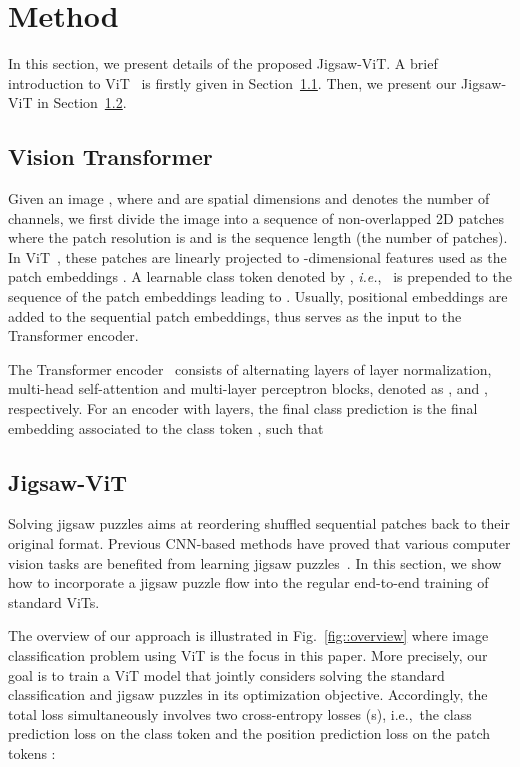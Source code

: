 \documentclass{article}
\begin{document}
\section{Method}
\label{sec:method}
In this section, we present details of the proposed Jigsaw-ViT. 
A brief introduction to ViT~\cite{dosovitskiy2021an} is firstly given in Section~\ref{subsec::ViT}. 
Then, we present our Jigsaw-ViT in Section~\ref{subsec::jigsaw}. 

\subsection{Vision Transformer}
\label{subsec::ViT}

Given an image , where  and  are spatial dimensions and  denotes the number of channels, we first divide the image into a sequence of non-overlapped 2D patches  where the patch resolution is  and  is the sequence length (the number of patches). 
In ViT~\cite{dosovitskiy2021an}, these patches are linearly projected to -dimensional features used as the patch embeddings . 
A learnable class token denoted by , \textit{i.e.},~ is prepended to the sequence of the patch embeddings  leading to . 
Usually, positional embeddings  are added to the sequential patch embeddings, thus  serves as the input to the Transformer encoder. 

The Transformer encoder~\cite{vaswani2017attention} consists of alternating layers of layer normalization, multi-head self-attention and multi-layer perceptron blocks, denoted as ,  and , respectively. 
For an encoder with  layers, the final class prediction  is the final embedding associated to the class token , such that



\subsection{Jigsaw-ViT}
\label{subsec::jigsaw}
    
Solving jigsaw puzzles aims at reordering shuffled sequential patches back to their original format. 
Previous CNN-based methods have proved that various computer vision tasks are benefited from learning jigsaw puzzles~\cite{noroozi2016unsupervised,carlucci2019domain,du2020fine}. 
In this section, we show how to incorporate a jigsaw puzzle flow into the regular end-to-end training of standard ViTs. 
    
The overview of our approach is illustrated in Fig.~\ref{fig::overview} where image classification problem using ViT is the focus in this paper.
More precisely, our goal is to train a ViT model that jointly considers solving the standard classification and jigsaw puzzles in its optimization objective.
Accordingly, the total loss  simultaneously involves two cross-entropy losses (s), i.e.,~the class prediction loss on the class token  and the position prediction loss on the patch tokens :
\end{document}
